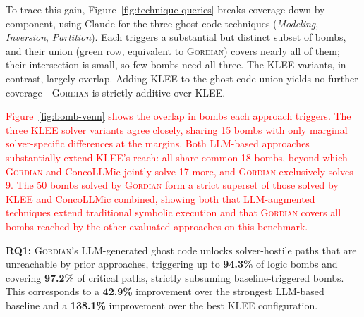 \documentclass[acmsmall]{acmart}
\newcommand{\rev}[1]{\textcolor{red}{#1}}
\newcommand{\rev}[1]{#1}
\newenvironment{gordianresultbox}{%
  \par\addvspace{0.5\baselineskip plus 2pt}%
  \noindent
  \begingroup
  \setlength{\fboxrule}{0.3mm}%
  \setlength{\fboxsep}{\dimexpr1mm+2pt\relax}%
  \begin{lrbox}{\gordianresultcontent}%
  \begin{minipage}{\dimexpr\linewidth-2\fboxrule-2\fboxsep\relax}%
}{%
  \end{minipage}%
  \end{lrbox}%
  \fcolorbox{black!20}{gray!5}{\usebox{\gordianresultcontent}}%
  \endgroup
  \par\addvspace{0.5\baselineskip plus 2pt}%
}
\newcommand{\projName}{\textsc{Gordian}\xspace}
\theoremstyle{definition}
\begin{document}
To trace this gain, Figure~\ref{fig:technique-queries} breaks coverage down by component, using Claude for the three ghost code techniques (\emph{Modeling}, \emph{Inversion}, \emph{Partition}). Each triggers a substantial but distinct subset of bombs, and their union (green row, equivalent to \projName{}) covers nearly all of them; their intersection is small, so few bombs need all three. The KLEE variants, in contrast, largely overlap. Adding KLEE to the ghost code union yields no further coverage---\projName{} is strictly additive over KLEE.

\rev{Figure~\ref{fig:bomb-venn} shows the overlap in bombs each approach triggers. The three KLEE solver variants agree closely, sharing 15 bombs with only marginal solver-specific differences at the margins. Both LLM-based approaches substantially extend KLEE's reach: all share common 18 bombs, beyond which \projName{} and ConcoLLMic jointly solve 17 more, and \projName{} exclusively solves 9. 
  The 50 bombs solved by \projName{} form a strict superset of those solved by KLEE and ConcoLLMic combined, showing both that LLM-augmented techniques extend traditional symbolic execution and that \projName{} covers all bombs reached by the other evaluated approaches on this benchmark.}

\begin{gordianresultbox}
\textbf{RQ1:} \projName{}'s LLM-generated ghost code unlocks solver-hostile paths that are unreachable by prior approaches, triggering up to \textbf{94.3\%} of logic bombs and covering \textbf{97.2\%} of critical paths, strictly subsuming baseline-triggered bombs. This corresponds to a \textbf{42.9\%} improvement over the strongest LLM-based baseline and a \textbf{138.1\%} improvement over the best KLEE configuration.
\end{gordianresultbox}



\end{document}
